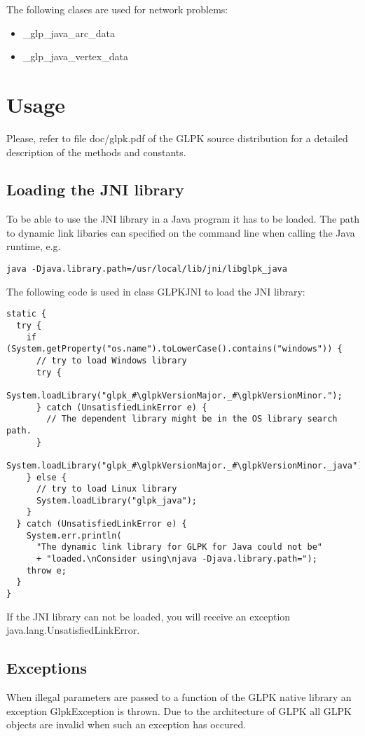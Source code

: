 \documentclass[a4paper,11pt]{report}
\newcommand{\glpkVersionMajor}{4}
\newcommand{\glpkVersionMinor}{55}
\begin{document}
The following clases are used for network problems:
\begin{itemize}
\item \_glp\_java\_arc\_data
\item \_glp\_java\_vertex\_data
\end{itemize}

\chapter{Usage}
Please, refer to file doc/glpk.pdf of the GLPK source distribution for a detailed description of the methods and constants.

\section{Loading the JNI library}
To be able to use the JNI library in a Java program it has to be loaded.
The path to dynamic link libaries can specified on the command line when
calling the Java runtime, e.g.
\begin{verbatim}
java -Djava.library.path=/usr/local/lib/jni/libglpk_java
\end{verbatim}

The following code is used in class GLPKJNI to load the JNI library:

\begin{lstlisting}
static {
  try {
    if (System.getProperty("os.name").toLowerCase().contains("windows")) {
      // try to load Windows library
      try {
        System.loadLibrary("glpk_#\glpkVersionMajor._#\glpkVersionMinor.");
      } catch (UnsatisfiedLinkError e) {
        // The dependent library might be in the OS library search path.
      }
      System.loadLibrary("glpk_#\glpkVersionMajor._#\glpkVersionMinor._java");
    } else {
      // try to load Linux library
      System.loadLibrary("glpk_java");
    }
  } catch (UnsatisfiedLinkError e) {
    System.err.println(
      "The dynamic link library for GLPK for Java could not be"
      + "loaded.\nConsider using\njava -Djava.library.path=");
    throw e;
  }
}
\end{lstlisting}

If the JNI library can not be loaded, you will receive an exception
\linebreak java.lang.UnsatisfiedLinkError.

\section{Exceptions}
When illegal parameters are passed to a function of the GLPK native library
an exception GlpkException is thrown. Due to the architecture of GLPK all
GLPK objects are invalid when such an exception has occured.
\end{document}
